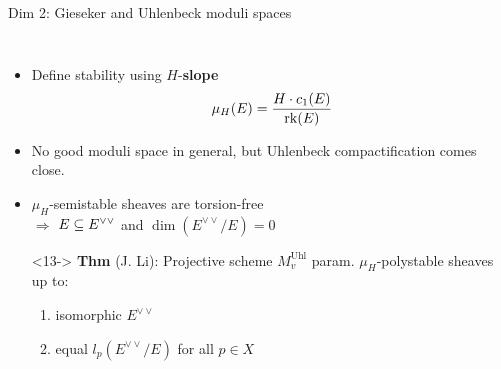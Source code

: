 \documentclass[8pt,handout]{beamer} %
\begin{document}
\begin{frame}[fragile]{Dim 2: Gieseker and Uhlenbeck moduli spaces}
\begin{columns}[t]
        \begin{itemize}
            \item<9-> Define stability using $H$-\textbf{slope}
            \[ \mu_H(E) = \frac{H \cdot c_1(E)}{\operatorname{\mathrm{rk}}(E)} \]
            \item<11-> No good moduli space in general, but Uhlenbeck compactification comes close.
            \item<12-> $\mu_H$-semistable sheaves are torsion-free \\
            $\Rightarrow$ $E \subseteq E^{\vee\vee}$ and $\dim(E^{\vee\vee}/E) = 0$
            \item[]
            \item[]<13-> \textbf{Thm} (J. Li): Projective scheme $M^{\text{Uhl}}_v$ param. $\mu_H$-polystable sheaves up to:
            \begin{enumerate}
                \item<14-> isomorphic $E^{\vee\vee}$ 
                \item<15-> equal $l_p(E^{\vee\vee}/E)$ for all $p \in X$
            \end{enumerate}
        \end{itemize}
    \end{columns}
\end{frame}
\end{document}
